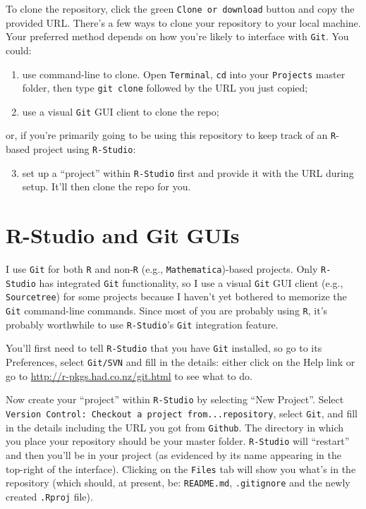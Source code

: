 \documentclass[12pt,letterpaper]{article}
\begin{document}
To clone the repository, click the green \texttt{Clone or download} button and copy the provided URL.
There's a few ways to clone your repository to your local machine.
Your preferred method depends on how you're likely to interface with \texttt{Git}.
You could:
\begin{enumerate}
	\item use command-line to clone.  Open \texttt{Terminal}, \texttt{cd} into your \texttt{Projects} master folder, then type \texttt{git clone} followed by the URL you just copied;
	\item use a visual \texttt{Git} GUI client to clone the repo;
\end{enumerate}
or, if you're primarily going to be using this repository to keep track of an \texttt{R}-based project using \texttt{R-Studio}:
\begin{enumerate}
  \setcounter{enumi}{2}
	\item set up a ``project'' within \texttt{R-Studio} first and provide it with the URL during setup.  It'll then clone the repo for you.
\end{enumerate}

\section{R-Studio and Git GUIs}
I use \texttt{Git} for both \texttt{R} and non-\texttt{R} (e.g.,  \texttt{Mathematica})-based projects.
Only  \texttt{R-Studio} has integrated  \texttt{Git} functionality, so I use a visual  \texttt{Git} GUI client (e.g., \texttt{Sourcetree}) for some projects because I haven't yet bothered to memorize the  \texttt{Git} command-line commands.
Since most of you are probably using \texttt{R}, it's probably worthwhile to use \texttt{R-Studio}'s \texttt{Git} integration feature.

You'll first need to tell \texttt{R-Studio} that you have \texttt{Git} installed, so go to its Preferences, select \texttt{Git/SVN} and fill in the details: either click on the Help link or go to
\url{http://r-pkgs.had.co.nz/git.html} to see what to do.

Now create your ``project'' within  \texttt{R-Studio} by selecting ``New Project''.
Select \texttt{Version Control: Checkout a project from...repository}, select \texttt{Git}, and fill in the details including the URL you got from \texttt{Github}.
The directory in which you place your repository should be your master folder.
\texttt{R-Studio} will ``restart'' and then you'll be in your project (as evidenced by its name appearing in the top-right of the interface).
Clicking on the \texttt{Files} tab will show you what's in the repository (which should, at present, be: \texttt{README.md}, \texttt{.gitignore} and the newly created \texttt{.Rproj} file).
\end{document}
